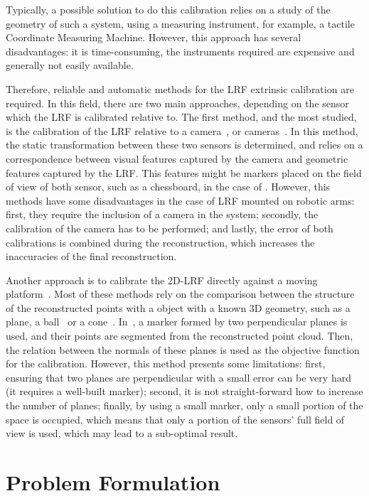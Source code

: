 \documentclass[conference]{IEEEtran}
\begin{document}
Typically, a possible solution to do this calibration relies on a study of the geometry of such a system, using a measuring instrument, for example, a tactile Coordinate Measuring Machine. However, this approach has several disadvantages: it is time-consuming, the instruments required are expensive and generally not easily available.

Therefore, reliable and automatic methods for the LRF extrinsic calibration are required. In this field, there are two main approaches, depending on the sensor which the LRF is calibrated relative to. The first method, and the most studied, is the calibration of the LRF relative to a camera~\cite{chen16,kassir10,zhang04}, or cameras~\cite{haeselich12}. In this method, the static transformation between these two sensors is determined, and relies on a correspondence between visual features captured by the camera and geometric features captured by the LRF. This features might be markers placed on the field of view of both sensor, such as a chessboard, in the case of \cite{kassir10}. However, this methods have some disadvantages in the case of LRF mounted on robotic arms: first, they require the inclusion of a camera in the system; secondly, the calibration of the camera has to be performed; and lastly, the error of both calibrations is combined during the reconstruction, which increases the inaccuracies of the final reconstruction. 

Another approach is to calibrate the 2D-LRF directly against a moving platform~\cite{zeng18}. Most of these methods rely on the comparison between the structure of the reconstructed points with a object with a known 3D geometry, such as a plane, a ball~\cite{pereira16} or a cone~\cite{almeida12}. In~\cite{kim13}, a marker formed by two perpendicular planes is used, and their points are segmented from the reconstructed point cloud. Then, the relation between the normals of these planes is used as the objective function for the calibration. However, this method presents some limitations: first, ensuring that two planes are perpendicular with a small error can be very hard (it requires a well-built marker); second, it is not straight-forward how to increase the number of planes; finally, by using a small marker, only a small portion of the space is occupied, which means that only a portion of the sensors' full field of view is used, which may lead to a sub-optimal result.


\section{Problem Formulation}\label{section:problem-formulation}
\end{document}

